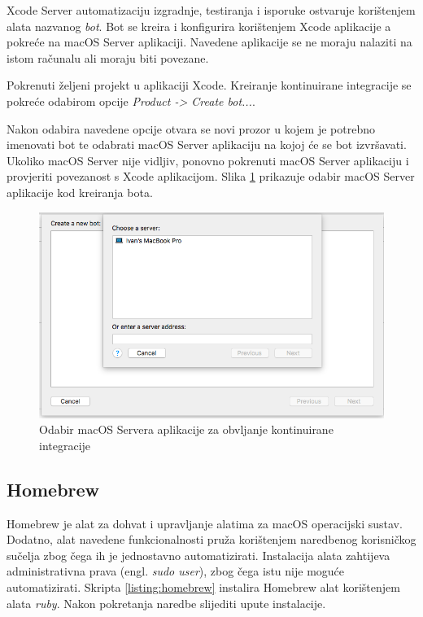\documentclass[times, utf8, diplomski, numeric]{fer}
\newcommand{\eng}[1]{(engl. \textit{#1})}
\begin{document}
Xcode Server automatizaciju izgradnje, testiranja i isporuke ostvaruje korištenjem alata nazvanog \textit{bot}. Bot se kreira i konfigurira korištenjem Xcode aplikacije a pokreće na macOS Server aplikaciji. Navedene aplikacije se ne moraju nalaziti na istom računalu ali moraju biti povezane.

Pokrenuti željeni projekt u aplikaciji Xcode. Kreiranje kontinuirane integracije se pokreće odabirom opcije \textit{Product -> Create bot...}.

Nakon odabira navedene opcije otvara se novi prozor u kojem je potrebno imenovati bot te odabrati macOS Server aplikaciju na kojoj će se bot izvršavati. Ukoliko macOS Server nije vidljiv, ponovno pokrenuti macOS Server aplikaciju i provjeriti povezanost s Xcode aplikacijom. Slika \ref{fig:BotServerSelection} prikazuje odabir macOS Server aplikacije kod kreiranja bota.

\begin{figure}
\centering
\includegraphics[scale=0.4]{BotServerSelection}
\caption{Odabir macOS Servera aplikacije za obvljanje kontinuirane integracije}
\label{fig:BotServerSelection}
\end{figure}

\subsection{Homebrew}

Homebrew je alat za dohvat i upravljanje alatima za macOS operacijski sustav\citep{homebrew}. Dodatno, alat navedene funkcionalnosti pruža korištenjem naredbenog korisničkog sučelja zbog čega ih je jednostavno automatizirati. Instalacija alata zahtijeva administrativna prava \eng{sudo user}, zbog čega istu nije moguće automatizirati. Skripta \ref{listing:homebrew} instalira Homebrew alat korištenjem alata \textit{ruby}. Nakon pokretanja naredbe slijediti upute instalacije.
\end{document}
